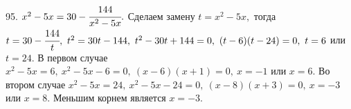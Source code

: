 95. $x^2-5x=30-\cfrac{144}{x^2-5x}.$ Сделаем замену $t=x^2-5x,$ тогда $t=30-\cfrac{144}{t},\ t^2=30t-144,\ t^2-30t+144=0,\ (t-6)(t-24)=0,\ t=6$ или $t=24.$ В первом случае $x^2-5x=6,\ x^2-5x-6=0,\ (x-6)(x+1)=0,\ x=-1$ или $x=6.$ Во втором случае $x^2-5x=24,\ x^2-5x-24=0,\ (x-8)(x+3)=0,\ x=-3$ или $x=8.$ Меньшим корнем является $x=-3.$\\
